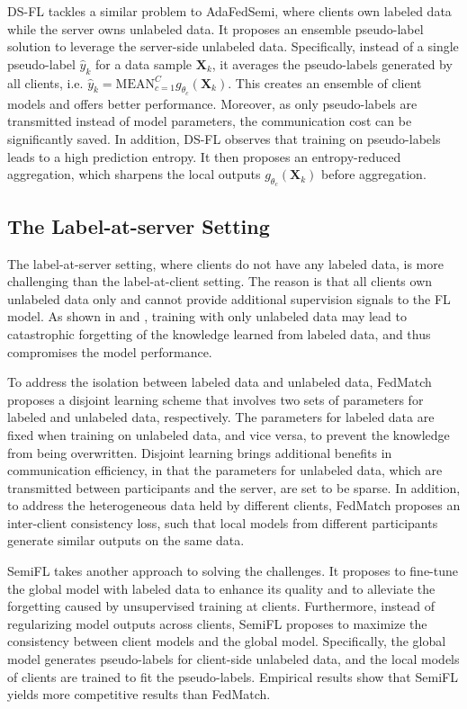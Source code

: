 \documentclass[11pt]{article}
\begin{document}
DS-FL \cite{itahara2021distillation} tackles a similar problem to AdaFedSemi, where clients own labeled data while the server owns unlabeled data. It proposes an ensemble pseudo-label solution to leverage the server-side unlabeled data. Specifically, instead of a single pseudo-label $\hat{y}_k$ for a data sample $\mathbf{X}_k$, it averages the pseudo-labels generated by all clients, i.e. $\hat{y}_k=\mathrm{MEAN}_{c=1}^C g_{\theta_c}(\mathbf{X}_k)$. This creates an ensemble of client models and offers better performance. Moreover, as only pseudo-labels are transmitted instead of model parameters, the communication cost can be significantly saved. In addition, DS-FL observes that training on pseudo-labels leads to a high prediction entropy. It then proposes an entropy-reduced aggregation, which sharpens the local outputs $g_{\theta_c}(\mathbf{X}_k)$ before aggregation. 

\subsection{The Label-at-server Setting}
The label-at-server setting, where clients do not have any labeled data, is more challenging than the label-at-client setting. The reason is that all clients own unlabeled data only and cannot provide additional supervision signals to the FL model. As shown in \cite{jeong2021federated} and \cite{diao2022semifl}, training with only unlabeled data may lead to catastrophic forgetting of the knowledge learned from labeled data, and thus compromises the model performance. 

To address the isolation between labeled data and unlabeled data, FedMatch \cite{jeong2021federated} proposes a disjoint learning scheme that involves two sets of parameters for labeled and unlabeled data, respectively. The parameters for labeled data are fixed when training on unlabeled data, and vice versa, to prevent the knowledge from being overwritten. Disjoint learning brings additional benefits in communication efficiency, in that the parameters for unlabeled data, which are transmitted between participants and the server, are set to be sparse. In addition, to address the heterogeneous data held by different clients, FedMatch proposes an inter-client consistency loss, such that local models from different participants generate similar outputs on the same data. 

SemiFL \cite{diao2022semifl} takes another approach to solving the challenges. It proposes to fine-tune the global model with labeled data to enhance its quality and to alleviate the forgetting caused by unsupervised training at clients. Furthermore, instead of regularizing model outputs across clients, SemiFL proposes to maximize the consistency between client models and the global model. Specifically, the global model generates pseudo-labels for client-side unlabeled data, and the local models of clients are trained to fit the pseudo-labels. Empirical results show that SemiFL yields more competitive results than FedMatch. 
\end{document}

